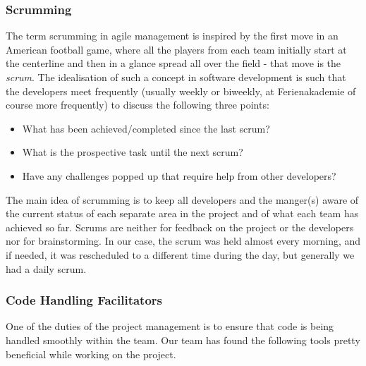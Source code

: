 \subsubsection{Scrumming}
The term scrumming in agile management is inspired by the first move in an American football game, where all the players from each team initially start at the centerline and then in a glance spread all over the field - that move is the \emph{scrum}. The idealisation of such a concept in software development is such that the developers meet frequently (usually weekly or biweekly, at Ferienakademie of course more frequently) to discuss the following three points:
\begin{itemize}
  \item{What has been achieved/completed since the last scrum?}
  \item{What is the prospective task until the next scrum?}
  \item{Have any challenges popped up that require help from other developers?}
\end{itemize}
The main idea of scrumming is to keep all developers and the manger(s) aware of the current status of each separate area in the project and of what each team has achieved so far. 
Scrums are neither for feedback on the project or the developers nor for brainstorming. 
In our case, the scrum was held almost every morning, and if needed, it was rescheduled to a different time during the day, but generally we had a daily scrum.

\subsubsection{Code Handling Facilitators}
One of the duties of the project management is to ensure that code is being handled smoothly within the team. Our team has found the following tools pretty beneficial while working on the project.

